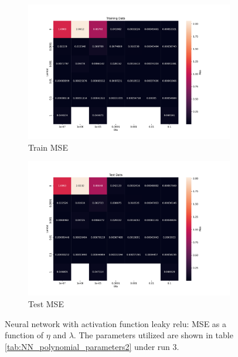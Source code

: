 \begin{figure}[htpb]
\begin{subfigure}{.5\textwidth}
  \centering
  \includegraphics[width=1.1\linewidth]{Figures/PartB/train_leaky_relu_MSE(eta,lmb)}
  \caption{Train MSE}
  \label{fig:train_leaky_relu_MSE-eta-lmb-}
\end{subfigure}%
\begin{subfigure}{.5\textwidth}
  \centering
  \includegraphics[width=1.1\linewidth]{Figures/PartB/test_leaky_relu_MSE(eta,lmb)}
  \caption{Test MSE}
  \label{fig:test_leaky_relu_MSE-eta-lmb-}
\end{subfigure}
\caption{Neural network with activation function leaky relu: MSE as a function of \(\eta \) and \(\lambda \). 
 The parameters utilized are shown in table \ref{tab:NN_polynomial_parameters2} under run 3.}
\label{fig:leaky_relu_MSE}
\end{figure}

